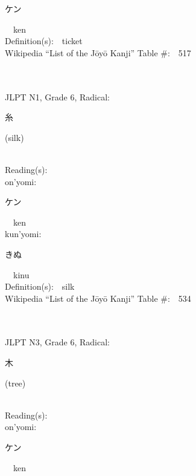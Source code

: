\begin{multicols}{2}
{\hspace*{2em}}{\begin{CJK}{UTF8}{min} ケン \end{CJK}}\ \ ken\ \ \\
Definition(s):\ \ ticket \\
Wikipedia ``List of the J\=oy\=o Kanji'' Table \#:\ \ 517 \\
\ \ \\
{\fontsize{34pt}{40pt}  }\ \ \\  %
{JLPT N1, Grade 6, Radical:\ \ {\begin{CJK}{UTF8}{min} 糸 \end{CJK}} (silk) } \\
Reading(s):\ \ \\
{\hspace*{1em}}on'yomi:\ \ \\
{\hspace*{2em}}{\begin{CJK}{UTF8}{min} ケン \end{CJK}}\ \ ken\ \ \\
{\hspace*{1em}}kun'yomi:\ \ \\
{\hspace*{2em}}{\begin{CJK}{UTF8}{min} きぬ \end{CJK}}\ \ kinu\ \ \\
Definition(s):\ \ silk \\
Wikipedia ``List of the J\=oy\=o Kanji'' Table \#:\ \ 534 \\
\ \ \\
{\fontsize{34pt}{40pt}  }\ \ \\  %
{JLPT N3, Grade 6, Radical:\ \ {\begin{CJK}{UTF8}{min} 木 \end{CJK}} (tree) } \\
Reading(s):\ \ \\
{\hspace*{1em}}on'yomi:\ \ \\
{\hspace*{2em}}{\begin{CJK}{UTF8}{min} ケン \end{CJK}}\ \ ken\ \ \\

\end{multicols}
